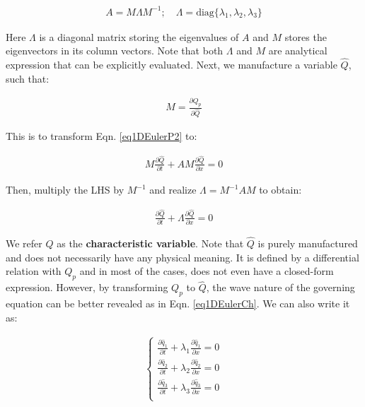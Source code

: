 \documentclass[12pt, letterpaper]{report}
\begin{document}
\begin{align*}
   A = M \Lambda M^{-1}; \quad \Lambda = \textrm{diag}\{\lambda_1, \lambda_2, \lambda_3\}
\end{align*}

Here $\Lambda$ is a diagonal matrix storing the eigenvalues of $A$ and $M$ stores the eigenvectors
in its column vectors. Note that both $\Lambda$ and $M$ are analytical expression that can be
explicitly evaluated. Next, we manufacture a variable $\widehat{Q}$, such that:

\begin{align*}
   M = \frac{\partial Q_p}{\partial \widehat{Q}}
\end{align*}

This is to transform Eqn. \ref{eq1DEulerP2} to:

\begin{align*}
   M\frac{\partial \widehat{Q}}{\partial t} + AM\frac{\partial \widehat{Q}}{\partial x} = 0
\end{align*}

Then, multiply the LHS by $M^{-1}$ and realize $\Lambda = M^{-1}AM$ to obtain:

\begin{align}\label{eq1DEulerCh}
   \frac{\partial \widehat{Q}}{\partial t} + \Lambda\frac{\partial \widehat{Q}}{\partial x} = 0
\end{align}

We refer $\widehat{Q}$ as the {\bf characteristic variable}. Note that $\widehat{Q}$ is purely
manufactured and does not necessarily have any physical meaning. It is defined by a differential
relation with $Q_p$ and in most of the cases, does not even have a closed-form expression. However,
by transforming $Q_p$ to $\widehat{Q}$, the wave nature of the governing equation can be better
revealed as in Eqn. \ref{eq1DEulerCh}. We can also write it as: 

\begin{align*}
   \begin{cases}
      \frac{\partial \widehat{q}_1}{\partial t} + \lambda_1 \frac{\partial \widehat{q}_1}{\partial
      x} = 0 \\ 
      \frac{\partial \widehat{q}_2}{\partial t} + \lambda_2 \frac{\partial
      \widehat{q}_2}{\partial x} = 0 \\
      \frac{\partial \widehat{q}_3}{\partial t} + \lambda_3 \frac{\partial
      \widehat{q}_3}{\partial x} = 0 \\
   \end{cases}
\end{align*}
\end{document}
